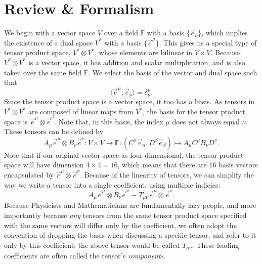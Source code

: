 \section{Review \& Formalism}
We begin with a vector space $V$ over a field $\mathbb{F}$ with a basis $\{\vec{e}_\nu\}$, which implies the existence of a dual space $V^*$ with a basis $\{\vec{e}^\mu\}$.
This gives us a special type of tensor product space, $ V^* \otimes V^*$, whose elements are bilinear in $V \times V$.
Because $V^* \otimes V^*$ is a vector space, it has addition and scalar multiplication, and is also taken over the same field $\mathbb{F}$.
We select the basis of the vector and dual space such that
\[ \langle \vec{e}^\mu, \vec{e}_\nu \rangle = \delta^\mu_\nu. \]
Since the tensor product space is a vector space, it too has a basis.
As tensors in $V^* \otimes V^*$ are composed of linear maps from $V^*$, the basis for the tensor product space is $\vec{e}^\mu \otimes \vec{e}^\nu$.
Note that, in this basis, the index $\mu$ does not always equal $\nu$.
These tensors can be defined by
\[ A_\mu \vec{e}^\mu \otimes B_\nu \vec{e}^\nu : V \times V \to \mathbb{F} : (C^\alpha \vec{e}_\alpha, D^\beta \vec{e}_\beta) \mapsto A_\mu C^\mu B_\nu D^\nu. \]
Note that if our original vector space as four dimensional, the tensor product space will have dimension $4 \times 4 = 16$, which means that there are 16 basis vectors encapsulated by $\vec{e}^\mu \otimes \vec{e}^\nu$.
Because of the linearity of tensors, we can simplify the way we write a tensor into a single coefficient, using multiple indicies:
\[ A_\mu \vec{e}^\mu \otimes B_\nu \vec{e}^\nu \equiv T_{\mu\nu} \vec{e}^\mu \otimes \vec{e}^\nu. \]
Because Physicists and Mathematicians are fundamentally lazy people, and more importantly because \emph{any} tensors from the same tensor product space specified with the same vectors will differ only by the coefficient, we often adopt the convention of dropping the basis when discussing a specific tensor, and refer to it only by this coefficient; the above tensor would be called $T_{\mu\nu}$. These leading coefficients are often called the tensor's \emph{components}.
